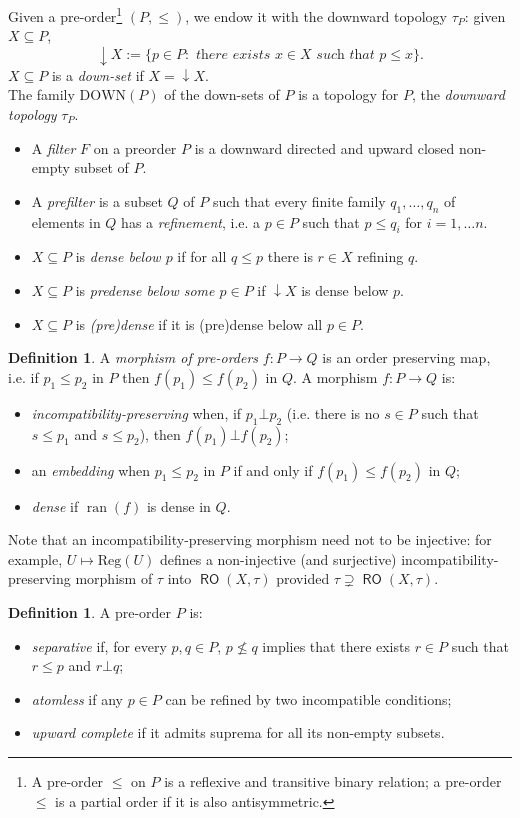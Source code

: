 \documentclass[11pt]{amsart}
\newcommand{\down}{\textrm{DOWN}}
\theoremstyle{plain}
\theoremstyle{definition}
\newtheorem{definition}[theorem]{Definition}
\theoremstyle{plain}
\theoremstyle{remark}
\DeclareMathOperator{\ran}{ran}
\DeclareMathOperator{\RO}{\mathsf{RO}}
\newcommand{\Reg}[1]{\mathrm{Reg}\left(#1\right)}
\newcommand{\0}{\mathsf{0}}
\renewcommand{\1}{\mathsf{1}}
\renewcommand{\2}{\mathsf{2}}
\theoremstyle{definition}
\begin{document}
Given a pre-order\footnote{A pre-order $\leq$ on $P$ is a reflexive and transitive binary relation; a pre-order $\leq$ is a partial order if it is also antisymmetric.} $(P, \leq)$, we endow it with the downward topology $\tau_P$:
given $X\subseteq P$,
\[
\downarrow X:=\{p\in P: \textit{ there exists } x\in X \textit{ such that } p\leq x\}.
\] 
$X\subseteq P$ is a \emph{down-set} if $X=\downarrow X$. \\
The family $\down(P)$ of the down-sets of $P$ is a topology for $P$, the \emph{downward topology} $\tau_P$.
\begin{itemize}
\item
A \emph{filter} $F$ on a preorder $P$ is a downward directed and upward closed non-empty subset of $P$.
\item
A \emph{prefilter} is a subset $Q$ of $P$ such that every finite family $q_1, \dots, q_n$ of elements in $Q$ has a \emph{refinement}, i.e. a $p\in P$ such that $p\leq q_i$ for $i=1,\dots n$.
\item $X\subseteq P$ is \emph{dense below $p$} if for all $q\leq p$ there is $r\in X$ refining $q$.
\item
$X\subseteq P$ is\emph{ predense below some $p\in P$} if $\downarrow X$ is dense below $p$.
\item
$X\subseteq P$ is \emph{(pre)dense} if it is (pre)dense below all $p\in P$.
\end{itemize}
\begin{definition}
\label{def:emb}
 A \emph{morphism of pre-orders} $f:P\to Q$ is an order preserving map, i.e. if $p_1\leq p_2$ in $P$ then $f(p_1)\leq f(p_2)$ in $Q$. A morphism $f:P\to Q$ is:
\begin{itemize}
\item \emph{incompatibility-preserving} when, if $p_1\bot p_2$ (i.e. there is no $s\in P$ such that $s\leq p_1$ and $s\leq p_2$), then $f(p_1)\bot f(p_2)$;
\item an \emph{embedding} when $p_1\leq p_2$ in $P$ if and only if $f(p_1)\leq f(p_2)$ in $Q$;
\item \emph{dense} if $\ran(f)$ is dense in $Q$.
\end{itemize}
\end{definition}
Note that an incompatibility-preserving morphism need not to be injective: for example, $U\mapsto\Reg{U}$ defines a non-injective (and surjective) incompatibility-preserving morphism of $\tau$ into $\RO(X,\tau)$ provided $\tau\supsetneq\RO(X,\tau)$.
\begin{definition}
A pre-order $P$ is:
\begin{itemize}
\item 
\emph{separative} if, for every $p, q\in P$, $p\nleq q$ implies that there exists $r\in P$ such that $r\leq p$ and $r\bot q$;
\item 
\emph{atomless} if any $p\in P$ can be refined by two incompatible conditions;
\item
\emph{upward complete} if it admits suprema for all its non-empty subsets.
\end{itemize}
\end{definition}
\end{document}
